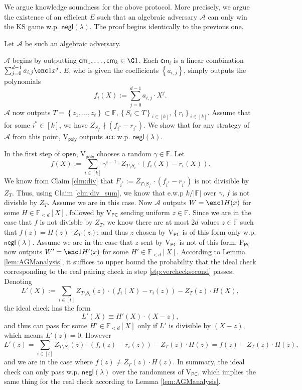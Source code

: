 \documentclass[11pt]{article} %
\newcommand{\F}{\ensuremath{\mathbb F}\xspace}
\newcommand{\adv}{\ensuremath{\mathcal A}\xspace}
\newcommand{\cm}{\ensuremath{\mathsf{cm}}\xspace}
\newcommand{\open}{\ensuremath{\mathsf{open}}\xspace}
\newcommand{\negl}{\ensuremath{\mathsf{negl}(\lambda)}\xspace}
\newcommand{\acc}{\ensuremath{\mathsf{acc}}\xspace}
\newcommand{\defeq}{:=}
\newcommand{\sett}[2]{\ensuremath{\set{#1}_{#2}}\xspace}
\newcommand{\prvpc}{\ensuremath{\mathrm{P_{\mathsf{PC}}}}\xspace}
\newcommand{\verpoly}{\ensuremath{\mathrm{V_{\mathsf{poly}}}}\xspace}
\newcommand{\verpc}{\ensuremath{\mathrm{V_{\mathsf{PC}}}}\xspace}
\newcommand{\ext}{\ensuremath{E}\xspace}
\newcommand{\set}[1]{\ensuremath{\left\{#1\right\}}\xspace}
\newcommand{\polysofdeg}[1]{\ensuremath{\F_{< #1}[X]}\xspace}
\begin{document}
    
    



We argue knowledge soundness for the above protocol. More precisely, we argue the existence of an efficient \ext such that an algebraic adversary \adv can only win the KS game w.p. \negl.  The proof begins identically to the previous one.


 Let \adv be such an algebraic adversary.

 \adv begins by outputting $\cm_1,\ldots,\cm_k\in \G1$.
 Each $\cm_i$ is a linear combination $\sum_{j=0}^{d-1} a_{i,j} \enc1{x^j}$.
 \ext, who is given the coefficients \set{a_{i,j}}, simply outputs the polynomials
 \[f_i(X)\defeq \sum_{j=0}^{d-1} a_{i,j} \cdot X^j.\]
 \adv now outputs $T=\set{z_1,\ldots,z_t}\subset \F,\sett{S_i\subset T}{i\in [k]},\sett{r_{i}}{i\in [k]}$.
  Assume that for some $i^*\in [k]$, we have $Z_{S_{i^*}}\nmid (f_{i^*}-r_{i^*})$. We show that for any strategy of \adv from this point, \verpoly outputs \acc w.p. \negl.

 In the first step of \open, \verpoly chooses a random $\gamma \in \F$.
 Let
 \[f(X)\defeq \sum_{i\in [k]} \gamma^{i-1} \cdot Z_{T\setminus S_i}\cdot (f_i(X)-r_i(X)).\]
 We know from Claim \ref{clm:div} that $F_{i^*} \defeq  Z_{T\setminus S_{i^*}}\cdot (f_{i^*}-r_{i^*})$ is not divisible by $Z_T$. Thus, using Claim \ref{clm:div_sum}, we know that e.w.p $k/|\F|$ over $\gamma$, $f$ is not divisble by $Z_T$. Assume we are in this case.  Now \adv outputs $W=\enc1{H(x)}$ for some $H\in\polysofdeg{d}$, followed by \verpc sending uniform $z\in \F$.
 Since we are in the case that $f$ is not divisble by $Z_T$, we know there are at most
 $2d$ values $z\in \F$ such that $f(z) = H(z)\cdot Z_T(z)$; and thus $z$ chosen by \verpc is of this form only w.p. \negl. Assume we are in the case that $z$ sent by \verpc is not of this form.
  \prvpc now outputs $W'=\enc1{H'(x)}$ for some $H'\in \polysofdeg{d}$.
 According to Lemma \ref{lem:AGManalysis}, it suffices to upper bound the probability that the ideal check corresponding to the real pairing check in step \ref{stp:verchecksecond} passes.
 Denoting
 \[L'(X)\defeq \sum_{i\in [t]} Z_{T\setminus S_i}(z)\cdot (f_i(X) - r_i(z)) - Z_T(z)\cdot H(X),\]
 the ideal check has the form
 \[L'(X)\equiv H'(X)\cdot (X-z),\]
 and thus can pass for some $H'\in \polysofdeg{d}$ only if $L'$ is divisible by $(X-z)$, which means $L'(z)=0$.
 However
 \[L'(z) = \sum_{i\in [t]} Z_{T\setminus S_i}(z)\cdot (f_i(z) - r_i(z)) - Z_T(z)\cdot H(z)=
  f(z)-Z_T(z)\cdot H(z),
 \]
and we are in the case where $f(z)\neq Z_T(z)\cdot H(z)$.
 In summary, the ideal check can only pass w.p. $\negl$ over the randomness of \verpc, which implies the same thing for the real check according to Lemma \ref{lem:AGManalysis}.
\end{document}
